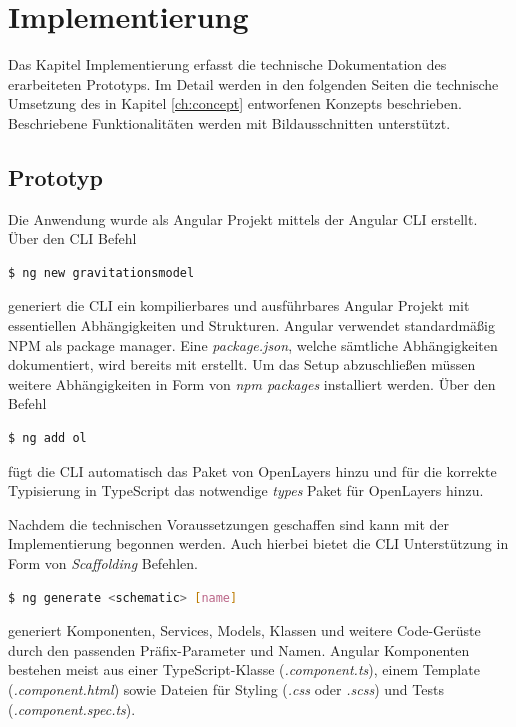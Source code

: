 \chapter{Implementierung}
\label{ch:implementierung}
Das Kapitel Implementierung erfasst die technische Dokumentation des erarbeiteten Prototyps.
Im Detail werden in den folgenden Seiten die technische Umsetzung des in Kapitel \ref{ch:concept} entworfenen Konzepts beschrieben. 
Beschriebene Funktionalitäten werden mit Bildausschnitten unterstützt.

\section{Prototyp}
Die Anwendung wurde als Angular Projekt mittels der Angular CLI erstellt. 
Über den CLI Befehl 

\begin{lstlisting}[language=bash]
$ ng new gravitationsmodel
\end{lstlisting}

generiert die CLI ein kompilierbares und ausführbares Angular Projekt mit essentiellen Abhängigkeiten und Strukturen.
Angular verwendet standardmäßig NPM als package manager.
Eine \emph{package.json}, welche sämtliche Abhängigkeiten dokumentiert, wird bereits mit erstellt.
Um das Setup abzuschließen müssen weitere Abhängigkeiten in Form von \emph{npm packages} installiert werden.
Über den Befehl 

\begin{lstlisting}[language=bash]
$ ng add ol
\end{lstlisting}

fügt die CLI automatisch das Paket von OpenLayers hinzu und für die korrekte Typisierung in TypeScript das notwendige \emph{types} Paket für OpenLayers hinzu.

Nachdem die technischen Voraussetzungen geschaffen sind kann mit der Implementierung begonnen werden.
Auch hierbei bietet die CLI Unterstützung in Form von \emph{Scaffolding} Befehlen.

\begin{lstlisting}[language=bash]
$ ng generate <schematic> [name]
\end{lstlisting}

generiert Komponenten, Services, Models, Klassen und weitere Code-Gerüste durch den passenden Präfix-Parameter und Namen.
Angular Komponenten bestehen meist aus einer TypeScript-Klasse (\emph{.component.ts}), einem Template (\emph{.component.html}) sowie Dateien für Styling (\emph{.css} oder \emph{.scss}) und Tests (\emph{.component.spec.ts}).

